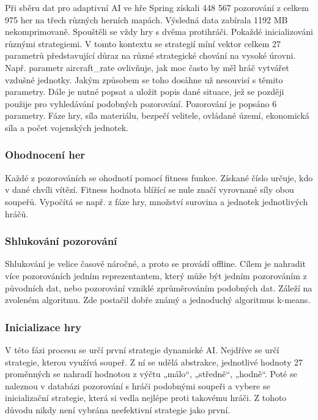 Při sběru dat pro adaptivní AI ve hře Spring získali 448 567 pozorování z celkem 975 her na třech různých herních mapách. Výsledná data zabírala 1192 MB nekomprimovaně. Spouštěli se vždy hry s dvěma protihráči. Pokaždé inicializováni různými strategiemi. V tomto kontextu se strategií míní vektor celkem 27 parametrů představující důraz na různé strategické chování na vysoké úrovni. Např. parametr aircraft\_rate ovlivňuje, jak moc často by měl hráč vytvářet vzdušné jednotky. Jakým způsobem se toho dosáhne už nesouvisí s těmito parametry. Dále je nutné popsat a uložit popis dané situace, jež se později použije pro vyhledávání podobných pozorování. Pozorování je popsáno 6 parametry. Fáze hry, síla materiálu, bezpečí velitele, ovládané území, ekonomická síla a počet vojenských jednotek.

\subsubsection{Ohodnocení her}

Každé z pozorováních se ohodnotí pomocí fitness funkce. Získané číslo určuje, kdo v dané chvíli vítězí. Fitness hodnota blížící se nule značí vyrovnané síly obou soupeřů. Vypočítá se např. z fáze hry, množství surovina a jednotek jednotlivých hráčů.

\subsubsection{Shlukování pozorování}

Shlukování je velice časově náročné, a proto se provádí offline. Cílem je nahradit více pozorováních jedním reprezentantem, který může být jedním pozorováním z původních dat, nebo pozorování vzniklé zprůměrováním podobných dat. Záleží na zvoleném algoritmu. Zde postačil dobře známý a jednoduchý algoritmus k-means.

\subsubsection{Inicializace hry}

V této fázi procesu se určí první strategie dynamické AI. Nejdříve se určí strategie, kterou využívá soupeř. Z ní se udělá abstrakce, jednotlivé hodnoty 27 proměnných se nahradí hodnotou z výčtu „málo“, „středně“, „hodně“.  Poté se naleznou v databázi pozorování s hráči podobnými soupeři a vybere se inicializační strategie, která si vedla nejlépe proti takovému hráči. Z tohoto důvodu nikdy není vybrána neefektivní strategie jako první.

